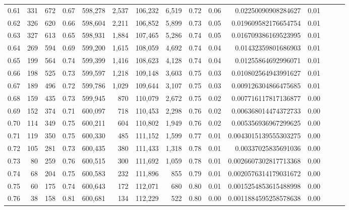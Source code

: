 \begin{tabular}{rrrrrrrrrrrrrrr}
0.61 &     331 &    672 &  0.67 &  598,278 &    2,537 &  106,232 &    6,519 &  0.72 &  0.06 &     0.02250090908284627 &      0.01 \\
0.62 &     326 &    620 &  0.66 &  598,604 &    2,211 &  106,852 &    5,899 &  0.73 &  0.05 &    0.019609582176654754 &      0.01 \\
0.63 &     327 &    613 &  0.65 &  598,931 &    1,884 &  107,465 &    5,286 &  0.74 &  0.05 &    0.016709386169523995 &      0.01 \\
0.64 &     269 &    594 &  0.69 &  599,200 &    1,615 &  108,059 &    4,692 &  0.74 &  0.04 &     0.01432359801686903 &      0.01 \\
0.65 &     199 &    564 &  0.74 &  599,399 &    1,416 &  108,623 &    4,128 &  0.74 &  0.04 &     0.01255864692996071 &      0.01 \\
0.66 &     198 &    525 &  0.73 &  599,597 &    1,218 &  109,148 &    3,603 &  0.75 &  0.03 &    0.010802564943991627 &      0.01 \\
0.67 &     189 &    496 &  0.72 &  599,786 &    1,029 &  109,644 &    3,107 &  0.75 &  0.03 &    0.009126304866475685 &      0.01 \\
0.68 &     159 &    435 &  0.73 &  599,945 &      870 &  110,079 &    2,672 &  0.75 &  0.02 &    0.007716117817136877 &      0.00 \\
0.69 &     152 &    374 &  0.71 &  600,097 &      718 &  110,453 &    2,298 &  0.76 &  0.02 &    0.006368014474372733 &      0.00 \\
0.70 &     114 &    349 &  0.75 &  600,211 &      604 &  110,802 &    1,949 &  0.76 &  0.02 &    0.005356936967299625 &      0.00 \\
0.71 &     119 &    350 &  0.75 &  600,330 &      485 &  111,152 &    1,599 &  0.77 &  0.01 &   0.0043015139555303275 &      0.00 \\
0.72 &     105 &    281 &  0.73 &  600,435 &      380 &  111,433 &    1,318 &  0.78 &  0.01 &     0.00337025835691036 &      0.00 \\
0.73 &      80 &    259 &  0.76 &  600,515 &      300 &  111,692 &    1,059 &  0.78 &  0.01 &   0.0026607302817713368 &      0.00 \\
0.74 &      68 &    204 &  0.75 &  600,583 &      232 &  111,896 &      855 &  0.79 &  0.01 &   0.0020576314179031672 &      0.00 \\
0.75 &      60 &    175 &  0.74 &  600,643 &      172 &  112,071 &      680 &  0.80 &  0.01 &   0.0015254853615488998 &      0.00 \\
0.76 &      38 &    158 &  0.81 &  600,681 &      134 &  112,229 &      522 &  0.80 &  0.00 &   0.0011884595258578638 &      0.00 \\

\end{tabular}
